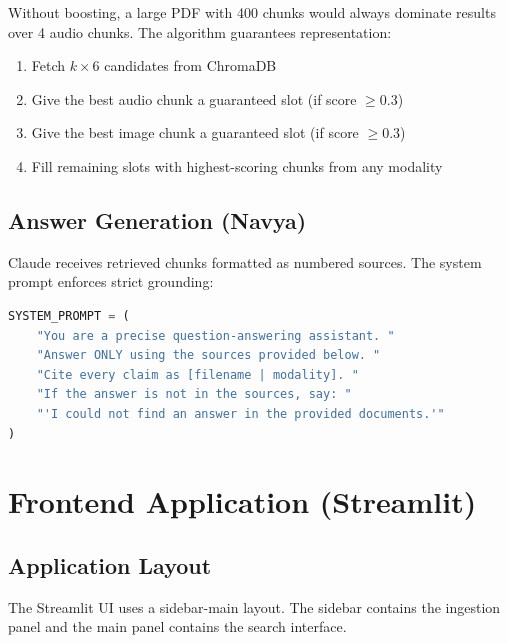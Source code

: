 \documentclass[12pt,a4paper]{report}
\begin{document}
Without boosting, a large PDF with 400 chunks would always dominate results over 4 audio chunks. The algorithm guarantees representation:

\begin{enumerate}[leftmargin=2cm]
    \item Fetch $k \times 6$ candidates from ChromaDB
    \item Give the best audio chunk a guaranteed slot (if score $\geq 0.3$)
    \item Give the best image chunk a guaranteed slot (if score $\geq 0.3$)
    \item Fill remaining slots with highest-scoring chunks from any modality
\end{enumerate}

\section{Answer Generation (Navya)}

Claude receives retrieved chunks formatted as numbered sources. The system prompt enforces strict grounding:

\begin{lstlisting}[language=Python, caption=Grounded Generation System Prompt]
SYSTEM_PROMPT = (
    "You are a precise question-answering assistant. "
    "Answer ONLY using the sources provided below. "
    "Cite every claim as [filename | modality]. "
    "If the answer is not in the sources, say: "
    "'I could not find an answer in the provided documents.'"
)
\end{lstlisting}

\chapter{Frontend Application (Streamlit)}

\section{Application Layout}

The Streamlit UI uses a sidebar-main layout. The sidebar contains the ingestion panel and the main panel contains the search interface.
\end{document}
